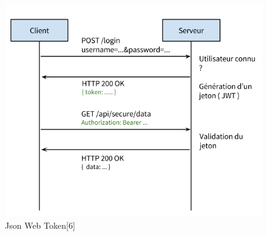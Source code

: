 \documentclass[12pt, ChapStyle1, oneside]{./Styles/Dea_Gsm}
\begin{document}
\begin{description}
\begin{figure}[H]
    \centering
    \includegraphics[width=5.0in]{Token-based-Auth}
    \caption{Json Web Token[6]}
    \label{Json Web Token}
\end{figure}
\end{description}
\end{document}
